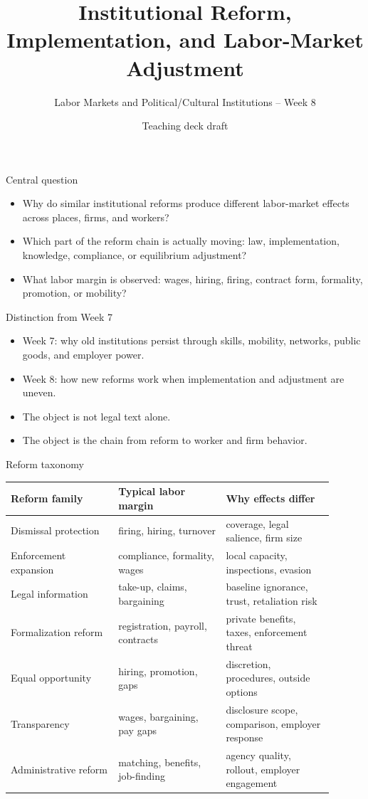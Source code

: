 \documentclass[aspectratio=169,11pt]{beamer}
\title{Institutional Reform, Implementation, and Labor-Market Adjustment}
\subtitle{Labor Markets and Political/Cultural Institutions -- Week 8}
\author{Teaching deck draft}
\date{}
\begin{document}
\begin{frame}
  \titlepage
\end{frame}

\begin{frame}{Central question}
\begin{itemize}
    \item Why do similar institutional reforms produce different labor-market effects across places, firms, and workers?
    \item Which part of the reform chain is actually moving: law, implementation, knowledge, compliance, or equilibrium adjustment?
    \item What labor margin is observed: wages, hiring, firing, contract form, formality, promotion, or mobility?
\end{itemize}
\end{frame}

\begin{frame}{Distinction from Week 7}
\begin{itemize}
    \item Week 7: why old institutions persist through skills, mobility, networks, public goods, and employer power.
    \item Week 8: how new reforms work when implementation and adjustment are uneven.
    \item The object is not legal text alone.
    \item The object is the chain from reform to worker and firm behavior.
\end{itemize}
\end{frame}

\begin{frame}{Reform taxonomy}
\small
\begin{tabular}{p{0.30\linewidth} p{0.30\linewidth} p{0.30\linewidth}}
\toprule
Reform family & Typical labor margin & Why effects differ \\
\midrule
Dismissal protection & firing, hiring, turnover & coverage, legal salience, firm size \\
Enforcement expansion & compliance, formality, wages & local capacity, inspections, evasion \\
Legal information & take-up, claims, bargaining & baseline ignorance, trust, retaliation risk \\
Formalization reform & registration, payroll, contracts & private benefits, taxes, enforcement threat \\
Equal opportunity & hiring, promotion, gaps & discretion, procedures, outside options \\
Transparency & wages, bargaining, pay gaps & disclosure scope, comparison, employer response \\
Administrative reform & matching, benefits, job-finding & agency quality, rollout, employer engagement \\
\bottomrule
\end{tabular}
\end{frame}
\end{document}
